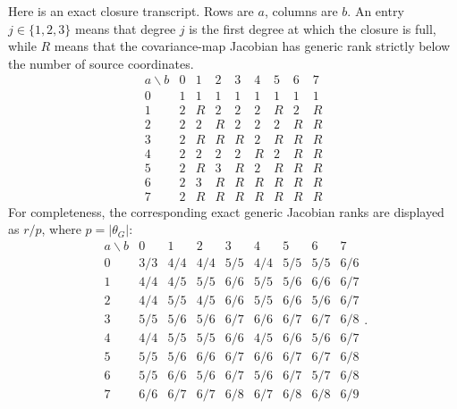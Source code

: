 Here is an exact closure transcript.  Rows are \(a\), columns are \(b\).  An entry \(j\in\{1,2,3\}\) means that degree \(j\) is the first degree at which the closure is full, while \(R\) means that the covariance-map Jacobian has generic rank strictly below the number of source coordinates.
\[
\begin{array}{c|cccccccc}
 a\backslash b&0&1&2&3&4&5&6&7\\ \hline
0&1&1&1&1&1&1&1&1\\
1&2&R&2&2&2&R&2&R\\
2&2&2&R&2&2&2&R&R\\
3&2&R&R&R&2&R&R&R\\
4&2&2&2&2&R&2&R&R\\
5&2&R&3&R&2&R&R&R\\
6&2&3&R&R&R&R&R&R\\
7&2&R&R&R&R&R&R&R
\end{array} \tag{2}
\]
For completeness, the corresponding exact generic Jacobian ranks are displayed as \(r/p\), where \(p=|\theta_G|\):
\[
\begin{array}{c|cccccccc}
 a\backslash b&0&1&2&3&4&5&6&7\\ \hline
0&3/3&4/4&4/4&5/5&4/4&5/5&5/5&6/6\\
1&4/4&4/5&5/5&6/6&5/5&5/6&6/6&6/7\\
2&4/4&5/5&4/5&6/6&5/5&6/6&5/6&6/7\\
3&5/5&5/6&5/6&6/7&6/6&6/7&6/7&6/8\\
4&4/4&5/5&5/5&6/6&4/5&6/6&5/6&6/7\\
5&5/5&5/6&6/6&6/7&6/6&6/7&6/7&6/8\\
6&5/5&6/6&5/6&6/7&5/6&6/7&5/7&6/8\\
7&6/6&6/7&6/7&6/8&6/7&6/8&6/8&6/9
\end{array}. \tag{3}
\]

